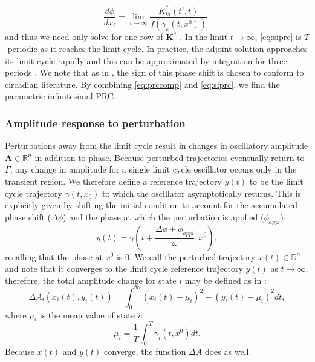 \begin{equation}\label{eq:siprc}
    \frac{d\phi}{dx_i} = \lim_{t\to\infty} \frac{K_{ki}^\ast (t',t)}{f(\gamma_k(t,x^0))},
\end{equation}
and thus we need only solve for one row of $\mathbf{K}^\ast$ \cite{Taylor2008a,Kramer1984}.
In the limit $t\to\infty$, \eqref{eq:siprc} is $T$-periodic as it reaches the limit cycle.
In practice, the adjoint solution approaches its limit cycle rapidly and this can be approximated by integration for three periods \cite{Taylor2008a}.
We note that as in \cite{Taylor2008a}, the sign of this phase shift is chosen to conform to circadian literature.
By combining \eqref{eq:prccomp} and \eqref{eq:siprc}, we find the parametric infinitesimal PRC.

\subsubsection*{Amplitude response to perturbation}
Perturbations away from the limit cycle result in changes in oscillatory amplitude $\mathbf{A}\in\mathbb{R}^n$ in addition to phase.
Because perturbed trajectories eventually return to $\Gamma$, any change in amplitude for a single limit cycle oscillator occurs only in the transient region.
We therefore define a reference trajectory $y(t)$ to be the limit cycle trajectory $\gamma(t,x_0)$ to which the oscillator asymptotically returns.
This is explicitly given by shifting the initial condition to account for the accumulated phase shift ($\Delta\phi$) and the phase at which the perturbation is applied ($\phi_{appl}$):
\begin{equation}
    y(t) = \gamma(t+\frac{\Delta\phi + \phi_{appl}}{\omega}, x^0),
\end{equation}
recalling that the phase at $x^0$ is 0.
We call the perturbed trajectory $x(t)\in\mathbb{R}^n$, and note that it converges to the limit cycle reference trajectory $y(t)$ as $t\to\infty$, therefore, the total amplitude change for state $i$ may be defined as in \cite{StJohn2014b}:
\begin{equation}\label{eq:amp}
    \Delta A_i(x_i(t),y_i(t)) = \int_0^\infty (x_i(t)-\mu_i)^2 - (y_i(t)-\mu_i)^2 dt, 
\end{equation}
where $\mu_i$ is the mean value of state $i$:
\begin{equation}
    \mu_i = \frac{1}{T}\int_0^T \gamma_i(t, x^0)dt.
\end{equation}
Because $x(t)$ and $y(t)$ converge, the function $\Delta A$ does as well.

